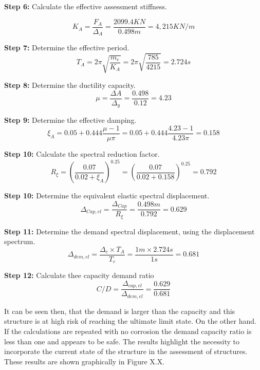\textbf{Step 6:} Calculate the effective assessment stiffness.

\begin{displaymath}
    K_{A}=\frac{F_{A}}{\Delta_{A}}=\frac{2099.4 KN}{0.498 m}=4,215 KN/m
\end{displaymath}

\textbf{Step 7:} Determine the effective period.
\begin{displaymath}
    T_{A}=2\pi \sqrt{\frac{m_e}{K_A}}=2\pi \sqrt{\frac{785}{4215}}=2.724 s
\end{displaymath}

\textbf{Step 8:} Determine the ductility capacity.
\begin{displaymath}
    \mu = \frac{\Delta{A}}{\Delta_{y}} = \frac{0.498}{0.12} = 4.23
\end{displaymath}

\textbf{Step 9:} Determine the effective damping.
\begin{displaymath}
    \xi_{A}=0.05+0.444\frac{\mu-1}{\mu\pi}=0.05+0.444\frac{4.23-1}{4.23\pi}=0.158
\end{displaymath}

\textbf{Step 10:} Calculate the spectral reduction factor.
\begin{displaymath}
     R_{\xi}=\left(\frac{0.07}{0.02+\xi_{A}}\right)^{0.25}=\left(\frac{0.07}{0.02+0.158}\right)^{0.25}=0.792
\end{displaymath}

\textbf{Step 10:} Determine the equivalent elastic spectral displacement.
\begin{displaymath}
     \Delta_{Cap,el}=\frac{\Delta_{Cap}}{R_{\xi}}=\frac{0.498m}{0.792}=0.629
\end{displaymath}

\textbf{Step 11:} Determine the demand spectral displacement, using the displacement spectrum.
\begin{displaymath}
     \Delta_{dem,el}=\frac{\Delta_{c} \times T_{A}}{T_{c}}=\frac{1m \times 2.724s}{1s}=0.681
\end{displaymath}

\textbf{Step 12:} Calculate thee capacity demand ratio
\begin{displaymath}
     C/D= \frac{\Delta_{cap,el}}{\Delta_{dem,el}}= \frac{0.629}{0.681}
\end{displaymath}

It can be seen then, that the demand is larger than the capacity and this structure is at high risk of reaching the ultimate limit state. On the other hand. If the calculations are repeated with no corrosion the demand capacity ratio is less than one and appears to be safe. The results highlight the necessity to incorporate the current state of the structure in the assessment of structures. These results are shown graphically in Figure X.X.


